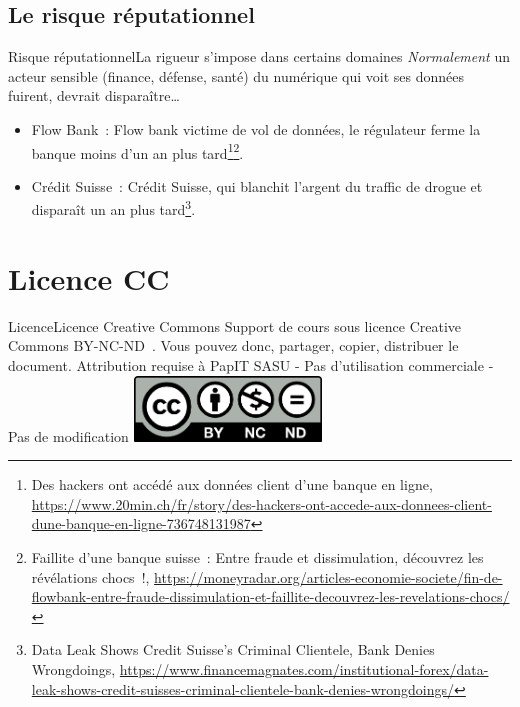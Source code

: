 \documentclass{beamer}
\begin{document}
    \subsection{Le risque réputationnel}\label{subsec:risque-reputationnel}
    \begin{frame}{Risque réputationnel}{La rigueur s'impose dans certains domaines}
        \textit{Normalement} un acteur sensible (finance, défense, santé) du numérique qui voit ses données fuirent, devrait disparaître\ldots
        \begin{itemize}
            \item Flow Bank~: Flow bank victime de vol de données, le régulateur ferme la banque moins d'un an plus tard\footnote{Des hackers ont accédé aux données client d’une banque en ligne, \url{https://www.20min.ch/fr/story/des-hackers-ont-accede-aux-donnees-client-dune-banque-en-ligne-736748131987}}\footnotestep\footnote{Faillite d’une banque suisse~: Entre fraude et dissimulation, découvrez les révélations chocs~!, \url{https://moneyradar.org/articles-economie-societe/fin-de-flowbank-entre-fraude-dissimulation-et-faillite-decouvrez-les-revelations-chocs/}}.
            \item Crédit Suisse~: Crédit Suisse, qui blanchit l'argent du traffic de drogue et disparaît un an plus tard\footnote{Data Leak Shows Credit Suisse’s Criminal Clientele, Bank Denies Wrongdoings, \url{https://www.financemagnates.com/institutional-forex/data-leak-shows-credit-suisses-criminal-clientele-bank-denies-wrongdoings/}}.
        \end{itemize}
    \end{frame}


    \section{Licence CC}\label{sec:licence}

    \begin{frame}{Licence}{Licence Creative Commons}
        Support de cours sous licence Creative Commons BY-NC-ND~.
        \bigbreak
        Vous pouvez donc, partager, copier, distribuer le document.
        \bigbreak
        Attribution requise à PapIT SASU - Pas d’utilisation commerciale - Pas de modification
        \bigbreak
        \centering
        \includegraphics[width=5cm]{image/by-nc-nd-logo}
    \end{frame}
\end{document}
